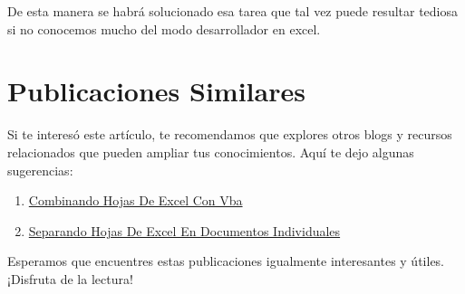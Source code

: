 \documentclass[
  jou,
  floatsintext,
  longtable,
  a4paper,
  nolmodern,
  notxfonts,
  notimes,
  12pt,
  colorlinks=true,linkcolor=blue,citecolor=blue,urlcolor=blue]{apa7}
\providecommand{\tightlist}{%
  \setlength{\itemsep}{0pt}\setlength{\parskip}{0pt}}
\begin{document}
De esta manera se habrá solucionado esa tarea que tal vez puede resultar
tediosa si no conocemos mucho del modo desarrollador en excel.

\section{Publicaciones Similares}\label{publicaciones-similares}

Si te interesó este artículo, te recomendamos que explores otros blogs y
recursos relacionados que pueden ampliar tus conocimientos. Aquí te dejo
algunas sugerencias:

\begin{enumerate}
\def\labelenumi{\arabic{enumi}.}
\tightlist
\item
  \href{https://numerus-scriptum.netlify.app/ofimatica/2023-05-31-combinando-hojas-de-excel-con-vba/index.pdf}{}
  \href{https://numerus-scriptum.netlify.app/ofimatica/2023-05-31-combinando-hojas-de-excel-con-vba}{Combinando
  Hojas De Excel Con Vba}
\item
  \href{https://numerus-scriptum.netlify.app/ofimatica/2023-06-05-separando-hojas-de-excel-en-documentos-individuales/index.pdf}{}
  \href{https://numerus-scriptum.netlify.app/ofimatica/2023-06-05-separando-hojas-de-excel-en-documentos-individuales}{Separando
  Hojas De Excel En Documentos Individuales}
\end{enumerate}

Esperamos que encuentres estas publicaciones igualmente interesantes y
útiles. ¡Disfruta de la lectura!
\end{document}
